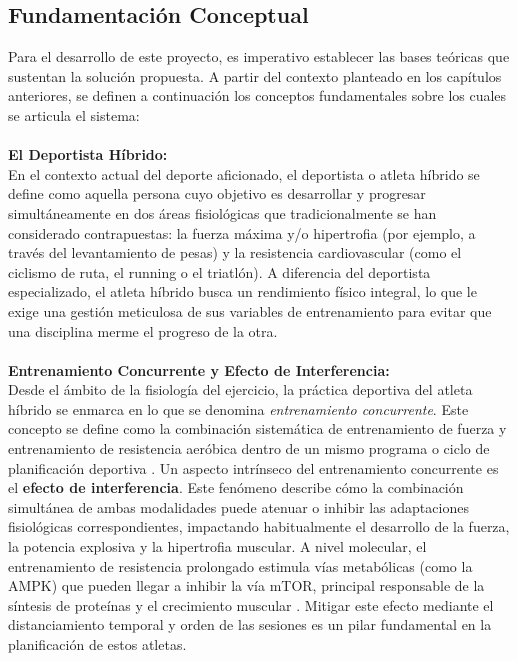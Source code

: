\documentclass[12pt]{article}
\begin{document}
\subsection{Fundamentación Conceptual}
Para el desarrollo de este proyecto, es imperativo establecer las bases teóricas que sustentan la solución propuesta. A partir del contexto planteado en los capítulos anteriores, se definen a continuación los conceptos fundamentales sobre los cuales se articula el sistema:
\\\\
\textbf{El Deportista Híbrido:}\\
En el contexto actual del deporte aficionado, el deportista o atleta híbrido se define como aquella persona cuyo objetivo es desarrollar y progresar simultáneamente en dos áreas fisiológicas que tradicionalmente se han considerado contrapuestas: la fuerza máxima y/o hipertrofia (por ejemplo, a través del levantamiento de pesas) y la resistencia cardiovascular (como el ciclismo de ruta, el running o el triatlón). A diferencia del deportista especializado, el atleta híbrido busca un rendimiento físico integral, lo que le exige una gestión meticulosa de sus variables de entrenamiento para evitar que una disciplina merme el progreso de la otra.
\\\\
\textbf{Entrenamiento Concurrente y Efecto de Interferencia:}\\
Desde el ámbito de la fisiología del ejercicio, la práctica deportiva del atleta híbrido se enmarca en lo que se denomina \textit{entrenamiento concurrente}. Este concepto se define como la combinación sistemática de entrenamiento de fuerza y entrenamiento de resistencia aeróbica dentro de un mismo programa o ciclo de planificación deportiva \citep{fisiologiadelejercicio}.
\newpage
Un aspecto intrínseco del entrenamiento concurrente es el \textbf{efecto de interferencia}. Este fenómeno describe cómo la combinación simultánea de ambas modalidades puede atenuar o inhibir las adaptaciones fisiológicas correspondientes, impactando habitualmente el desarrollo de la fuerza, la potencia explosiva y la hipertrofia muscular. A nivel molecular, el entrenamiento de resistencia prolongado estimula vías metabólicas (como la AMPK) que pueden llegar a inhibir la vía mTOR, principal responsable de la síntesis de proteínas y el crecimiento muscular \citep{aptavs2025concurrente}. Mitigar este efecto mediante el distanciamiento temporal y orden de las sesiones es un pilar fundamental en la planificación de estos atletas.
\\\\
\end{document}
